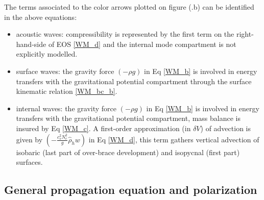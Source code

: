 \documentclass[a4paper,11pt]{article}
\begin{document}
The terms associated to the color arrows plotted on figure (.b) can be identified in the above equations:
\begin{itemize}
	\item acoustic waves: compressibility is represented by the first term on the right-hand-side of EOS \ref{WM_d} and the internal mode compartment is not explicitly modelled.
	\item surface waves: the gravity force $(-\rho g)$ in Eq \ref{WM_b} is involved in energy transfers with the gravitational potential compartment through the surface kinematic relation \ref{WM_bc_b}.
	\item internal waves: the gravity force $(-\rho g)$ in Eq \ref{WM_b} is involved in energy transfers with the gravitational potential compartment, mass balance is insured by Eq \ref{WM_c}. A first-order approximation (in $\delta V$) of advection is given by $(-\frac{c_s^2 N_c^2}{g} \hat{\rho}_h w)$ in Eq \ref{WM_d}, this term gathers vertical advection of isobaric (last part of over-brace development) and isopycnal (first part) surfaces.
\end{itemize}



\subsection{General propagation equation and polarization}
\end{document}
